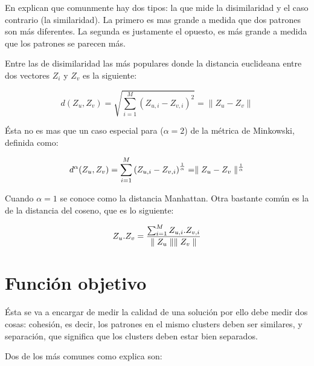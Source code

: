 En  \cite{SwAjAm2009} explican que comunmente hay dos tipos: la que mide la disimilaridad y el caso contrario (la
similaridad). La primero es mas grande a medida que dos patrones son
m\'as diferentes. La segunda es justamente el opuesto, es m\'as
grande a medida que los patrones se parecen m\'as.

Entre las de disimilaridad las m\'as populares donde la distancia euclideana entre
dos vectores $Z_i$ y $Z_v$ es la siguiente:

\[
d(Z_u,Z_v) = \sqrt {\sum_{i=1}^M {(Z_{u,i} - Z_{v,i})}^2} = \parallel Z_u - Z_v \parallel
\]

\'Esta no es mas que un caso especial para ($\alpha = 2$) de la m\'etrica de 
Minkowski, definida como:

\[
d^{\alpha}(Z_u,Z_v) = \sum_{i=1}^M {(Z_{u,i} - Z_{v,i})}^{1 \over \alpha} = \parallel Z_u - Z_v \parallel ^ {1 \over \alpha}
\]

Cuando $\alpha = 1$ se conoce como la distancia Manhattan. Otra bastante com\'un es
la de la distancia del coseno, que es lo siguiente:

\[
Z_u . Z_v =  {{\sum_{i=1}^M {Z_{u,i} . Z_{v,i}}}  \over { \parallel Z_u \parallel \parallel Z_v \parallel}}
\]

\section{Funci\'on objetivo} \label{sect:fobjetivo}

\'Esta se va a encargar de medir la calidad de una soluci\'on por ello
debe medir dos cosas: cohesi\'on, es decir, los patrones en el mismo clusters
deben ser similares, y separaci\'on, que significa que los clusters
deben estar bien separados.

Dos de los m\'as comunes como explica \cite{SwAjAm2009} son:

